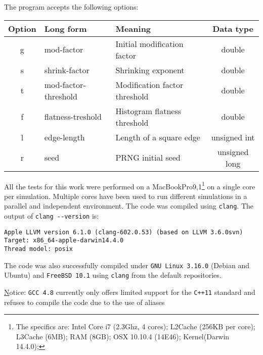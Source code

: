\documentclass[11pt]{article}
\begin{document}
The program accepts the following options:
\begin{center}\begin{tabular}{cllc}
\toprule
Option	&	Long form				&	Meaning							& Data type		\\
\midrule
g 		&	mod-factor				&	Initial modification factor		& double		\\
s 		&	shrink-factor			&	Shrinking exponent				& double		\\
t 		&	mod-factor-threshold	&	Modification factor threshold	& double		\\
f 		&	flatness-treshold		&	Histogram flatness threshold	& double 		\\
l 		&	edge-length				&	Length of a square edge			& unsigned int	\\
r 		&	seed					&	PRNG initial seed				& unsigned long	\\
\bottomrule
\end{tabular}\end{center}

All the tests for this work were performed on a MacBookPro9,1\footnote{The specifics are: 
Intel Core i7 (2.3Ghz, 4 cores); L2Cache (256KB per core); L3Cache (6MB); RAM (8GB); OSX 10.10.4 (14E46); Kernel(Darwin 14.4.0);} on a single core per simulation. Multiple cores have been used to run different simulations in a parallel and independent environment. The code was compiled using \verb|clang|. The output of \verb|clang --version| is: \begin{verbatim}
Apple LLVM version 6.1.0 (clang-602.0.53) (based on LLVM 3.6.0svn)
Target: x86_64-apple-darwin14.4.0
Thread model: posix
\end{verbatim}

The code was also successfully compiled under \verb|GNU Linux 3.16.0| (Debian and Ubuntu)  and \verb|FreeBSD 10.1| using \verb|clang| from the default repositories.

{\underline Notice:} \verb|GCC 4.8| currently only offers limited support for the \verb|C++11| standard and refuses to compile the code due to the use of aliases
\end{document}
